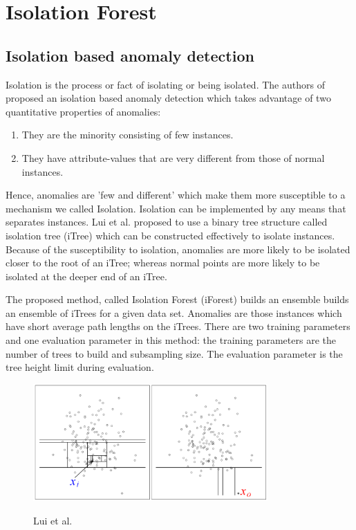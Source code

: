 \chapter{Isolation Forest}
\label{ch:isolation-forest}

\section{Isolation based anomaly detection}
\label{sec:isolation-based-anomaly-detection}

Isolation is the process or fact of isolating or being isolated.
The authors of \cite{10.1145/2133360.2133363} proposed an isolation based anomaly detection which takes advantage of two quantitative properties of anomalies:
\begin{enumerate}
    \item They are the minority consisting of few instances.
    \item They have attribute-values that are very different from those of normal instances.
\end{enumerate}

Hence, anomalies are 'few and different' which make them more susceptible to a mechanism we called Isolation.
Isolation can be implemented by any means that separates instances.
Lui et al. \cite{10.1145/2133360.2133363} proposed to use a binary tree structure called isolation tree (iTree) which can be constructed effectively to isolate instances.
Because of the susceptibility to isolation, anomalies are more likely to be isolated closer to the root of an iTree;
whereas normal points are more likely to be isolated at the deeper end of an iTree.

The proposed method, called Isolation Forest (iForest) builds an ensemble  builds an ensemble of iTrees for a given data set.
Anomalies are those instances which have short average path lengths on the iTrees.
There are two training parameters and one evaluation parameter in this method: the training parameters are the number of trees to build and subsampling size.
The evaluation parameter is the tree height limit during evaluation.

\vspace{1em}
\begin{figure}[!ht]
    \centering
    \includegraphics[width=0.80\textwidth]{../fig/chapter2/isolating-a-point.png}
    
    {Lui et al. \cite{10.1145/2133360.2133363}}
    \label{fig:isolating-a-point}
\end{figure}



